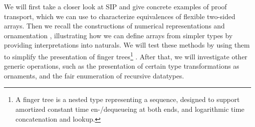 We will first take a closer look at SIP \cite{iri} and give concrete examples of proof transport, which we can use to characterize equivalences of flexible two-sided arrays. Then we recall the constructions of numerical representations \cite{calcdata} and ornamentation \cite{progorn}, illustrating how we can define arrays from simpler types by providing interpretations into naturals. We will test these methods by using them to simplify the presentation of finger trees\footnote{A finger tree is a nested type representing a sequence, designed to support amortized constant time en-/dequeueing at both ends, and logarithmic time concatenation and lookup.} \cite{fingertrees}. After that, we will investigate other generic operations, such as the presentation of certain type transformations as ornaments, and the fair enumeration of recursive datatypes.





